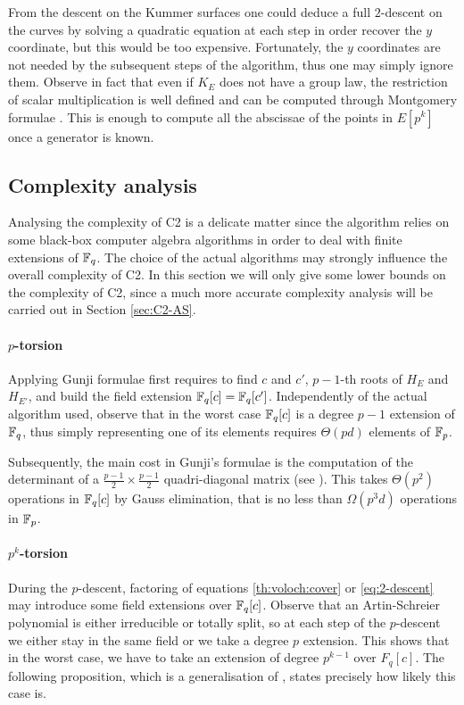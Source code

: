 From the descent on the Kummer surfaces one could deduce a full
$2$-descent on the curves by solving a quadratic equation at each step
in order recover the $y$ coordinate, but this would be too
expensive. Fortunately, the $y$ coordinates are not needed by the
subsequent steps of the algorithm, thus one may simply ignore
them. Observe in fact that even if $K_E$ does not have a group law,
the restriction of scalar multiplication is well defined and can be
computed through Montgomery formulae \cite{Mon87}. This is enough to
compute all the abscissae of the points in $E[p^k]$ once a generator
is known.


\subsection{Complexity analysis}
\label{sec:C2:complexity}
Analysing the complexity of C2 is a delicate matter since the
algorithm relies on some black-box computer algebra algorithms in
order to deal with finite extensions of $\mathbb{F}_q$. The choice of the
actual algorithms may strongly influence the overall complexity of C2.
In this section we will only give some lower bounds on the complexity
of C2, since a much more accurate complexity analysis will be carried
out in Section \ref{sec:C2-AS}.

\paragraph{$p$-torsion}
Applying Gunji formulae first requires to find $c$ and $c'$, $p-1$-th
roots of $H_E$ and $H_{E'}$, and build the field extension $\mathbb{F}_q[c] =
\mathbb{F}_q[c']$. Independently of the actual algorithm used, observe that in
the worst case $\mathbb{F}_q[c]$ is a degree $p-1$ extension of $\mathbb{F}_q$, thus
simply representing one of its elements requires $\Theta(pd)$ elements
of $\mathbb{F}_p$.

Subsequently, the main cost in Gunji's formulae is the computation of
the determinant of a $\frac{p-1}{2}\times\frac{p-1}{2}$
quadri-diagonal matrix (see \cite{Gun76}). This takes $\Theta(p^2)$
operations in $\mathbb{F}_q[c]$ by Gauss elimination, that is no less than
$\Omega(p^3d)$ operations in $\mathbb{F}_p$.

\paragraph{$p^k$-torsion}
During the $p$-descent, factoring of equations \eqref{th:voloch:cover}
or \eqref{eq:2-descent} may introduce some field extensions over
$\mathbb{F}_q[c]$. Observe that an Artin-Schreier polynomial is either
irreducible or totally split, so at each step of the $p$-descent we
either stay in the same field or we take a degree $p$ extension. This
shows that in the worst case, we have to take an extension of degree
$p^{k-1}$ over $F_q[c]$. The following proposition, which is a
generalisation of \cite[Prop. 26]{Ler97}, states precisely how likely
this case is.

